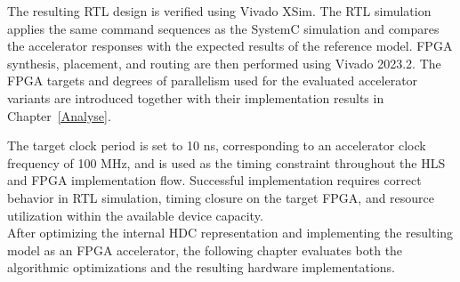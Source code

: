 The resulting RTL design is verified using Vivado XSim. The RTL simulation applies the same command sequences as the SystemC simulation and compares the accelerator responses with the expected results of the reference model.
FPGA synthesis, placement, and routing are then performed using Vivado 2023.2. The FPGA targets and degrees of parallelism used for the evaluated accelerator variants are introduced together with their implementation results in Chapter~\ref{Analyse}.

The target clock period is set to 10 ns, corresponding to an accelerator clock frequency of 100 MHz, and is used as the timing constraint throughout the HLS and FPGA implementation flow. Successful implementation requires correct behavior in RTL simulation, timing closure on the target FPGA, and resource utilization within the available device capacity.\\

After optimizing the internal HDC representation and implementing the resulting model as an FPGA accelerator, the following chapter evaluates both the algorithmic optimizations and the resulting hardware implementations.